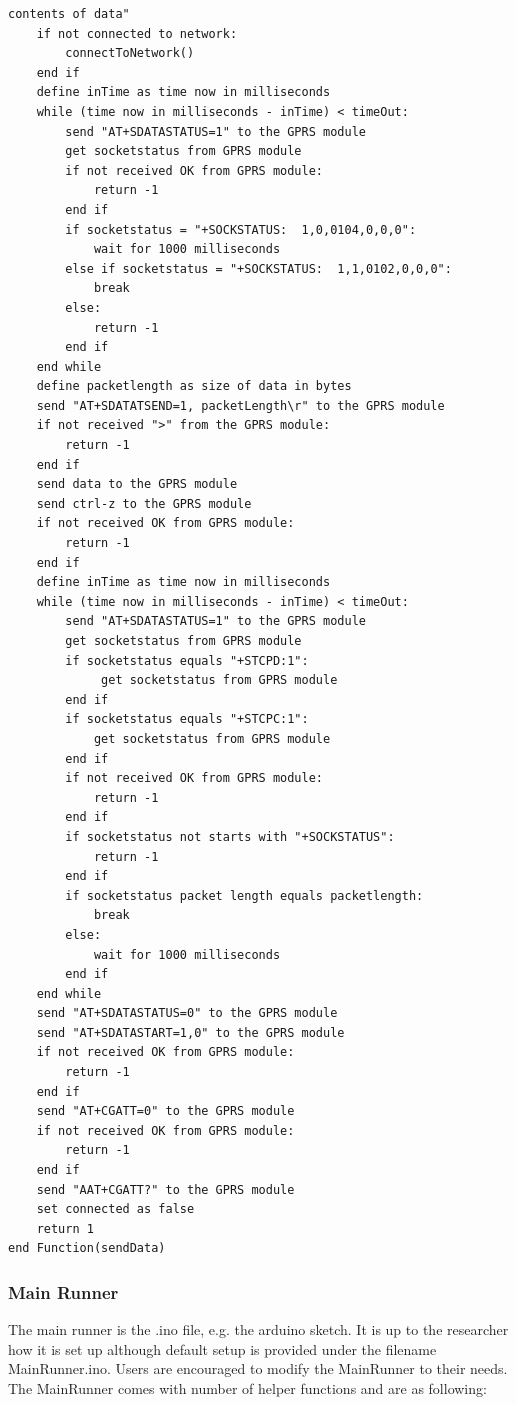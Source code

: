 \begin{lstlisting}[frame=single, label=pseodoGprsGateway, caption={Pseudocode of GprsGateway connectToNetwork() and sendData() functions}]
                    contents of data"
    if not connected to network:
        connectToNetwork()
    end if
    define inTime as time now in milliseconds
    while (time now in milliseconds - inTime) < timeOut:
        send "AT+SDATASTATUS=1" to the GPRS module
        get socketstatus from GPRS module
        if not received OK from GPRS module:
            return -1
        end if
        if socketstatus = "+SOCKSTATUS:  1,0,0104,0,0,0":
            wait for 1000 milliseconds
        else if socketstatus = "+SOCKSTATUS:  1,1,0102,0,0,0":
            break
        else:
            return -1
        end if
    end while
    define packetlength as size of data in bytes
    send "AT+SDATATSEND=1, packetLength\r" to the GPRS module
    if not received ">" from the GPRS module:
        return -1
    end if
    send data to the GPRS module
    send ctrl-z to the GPRS module
    if not received OK from GPRS module:
        return -1
    end if    
    define inTime as time now in milliseconds
    while (time now in milliseconds - inTime) < timeOut:
        send "AT+SDATASTATUS=1" to the GPRS module
        get socketstatus from GPRS module
        if socketstatus equals "+STCPD:1":
             get socketstatus from GPRS module
        end if
        if socketstatus equals "+STCPC:1":
            get socketstatus from GPRS module
        end if
        if not received OK from GPRS module:
            return -1
        end if
        if socketstatus not starts with "+SOCKSTATUS":
            return -1
        end if
        if socketstatus packet length equals packetlength:
            break
        else:
            wait for 1000 milliseconds
        end if
    end while
    send "AT+SDATASTATUS=0" to the GPRS module
    send "AT+SDATASTART=1,0" to the GPRS module
    if not received OK from GPRS module:
        return -1
    end if
    send "AT+CGATT=0" to the GPRS module
    if not received OK from GPRS module:
        return -1
    end if
    send "AAT+CGATT?" to the GPRS module
    set connected as false
    return 1
end Function(sendData)
\end{lstlisting}

\subsubsection{Main Runner}
The main runner is the .ino file, e.g. the arduino sketch. It is up to the researcher
how it is set up although default setup is provided under the filename MainRunner.ino. 
Users are encouraged to modify the MainRunner to their needs. The MainRunner comes 
with number of helper functions and are as following:

